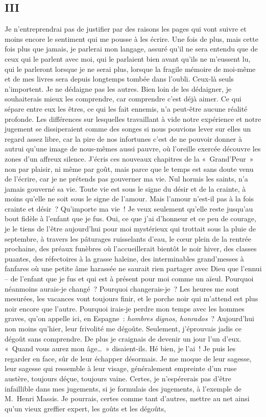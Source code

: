 \documentclass[french,twoside]{book} %
\begin{document}
\subsection[{III}]{III}
\noindent Je n’entreprendrai pas de justifier par des raisons les pages qui vont suivre et moins encore le sentiment qui me pousse à les écrire. Une fois de plus, mais cette fois plus que jamais, je parlerai mon langage, assuré qu’il ne sera entendu que de ceux qui le parlent avec moi, qui le parlaient bien avant qu’ils ne m’eussent lu, qui le parleront lorsque je ne serai plus, lorsque la fragile mémoire de moi-même et de mes livres sera depuis longtemps tombée dans l’oubli. Ceux-là seuls n’importent. Je ne dédaigne pas les autres. Bien loin de les dédaigner, je souhaiterais mieux les comprendre, car comprendre c’est déjà aimer. Ce qui sépare entre eux les êtres, ce qui les fait ennemis, n’a peut-être aucune réalité profonde. Les différences sur lesquelles travaillant à vide notre expérience et notre jugement se dissiperaient comme des songes si nous pouvions lever sur elles un regard assez libre, car la pire de nos infortunes c’est de ne pouvoir donner à autrui qu’une image de nous-mêmes aussi pauvre, où l’oreille exercée découvre les zones d’un affreux silence. J’écris ces nouveaux chapitres de la « Grand’Peur » non par plaisir, ni même par goût, mais parce que le temps est sans doute venu de l’écrire, car je ne prétends pas gouverner ma vie. Nul hormis les saints, n’a jamais gouverné sa vie. Toute vie est sous le signe du désir et de la crainte, à moins qu’elle ne soit sous le signe de l’amour. Mais l’amour n’est-il pas à la fois crainte et désir ? Qu’importe ma vie ! Je veux seulement qu’elle reste jusqu’au bout fidèle à l’enfant que je fus. Oui, ce que j’ai d’honneur et ce peu de courage, je le tiens de l’être aujourd’hui pour moi mystérieux qui trottait sous la pluie de septembre, à travers les pâturages ruisselants d’eau, le cœur plein de la rentrée prochaine, des préaux funèbres où l’accueillerait bientôt le noir hiver, des classes puantes, des réfectoires à la grasse haleine, des interminables grand’messes à fanfares où une petite âme harassée ne saurait rien partager avec Dieu que l’ennui – de l’enfant que je fus et qui est à présent pour moi comme un aïeul. Pourquoi néanmoins aurais-je changé ? Pourquoi changerais-je ? Les heures me sont mesurées, les vacances vont toujours finir, et le porche noir qui m’attend est plus noir encore que l’autre. Pourquoi irais-je perdre mon temps avec les hommes graves, qu’on appelle ici, en Espagne : \emph{hombres dignos, honrados} ? Aujourd’hui non moins qu’hier, leur frivolité me dégoûte. Seulement, j’éprouvais jadis ce dégoût sans comprendre. De plus je craignais de devenir un jour l’un d’eux. « Quand vous aurez mon âge… » disaient-ils. Hé bien, je l’ai ! Je puis les regarder en face, sûr de leur échapper désormais. Je me moque de leur sagesse, leur sagesse qui ressemble à leur visage, généralement empreinte d’un ruse austère, toujours déçue, toujours vaine. Certes, je n’espérerais pas d’être infaillible dans mes jugements, si je formulais des jugements, à l’exemple de M. Henri Massis. Je pourrais, certes comme tant d’autres, mettre au net ainsi qu’un vieux greffier expert, les goûts et les dégoûts, 
\end{document}
